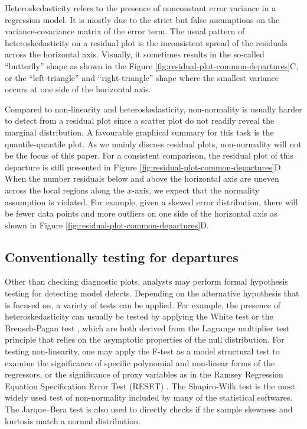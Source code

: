 \documentclass[]{interact}
\theoremstyle{plain}%
\theoremstyle{definition}
\theoremstyle{remark}
\begin{document}
Heteroskedasticity refers to the presence of nonconstant error variance
in a regression model. It is mostly due to the strict but false
assumptions on the variance-covariance matrix of the error term. The
usual pattern of heteroskedasticity on a residual plot is the
inconsistent spread of the residuals across the horizontal axis.
Visually, it sometimes results in the so-called ``butterfly'' shape as
shown in the Figure \ref{fig:residual-plot-common-departures}C, or the
``left-triangle'' and ``right-triangle'' shape where the smallest
variance occurs at one side of the horizontal axis.

Compared to non-linearity and heteroskedasticity, non-normality is
usually harder to detect from a residual plot since a scatter plot do
not readily reveal the marginal distribution. A favourable graphical
summary for this task is the quantile-quantile plot. As we mainly
discuss residual plots, non-normality will not be the focus of this
paper. For a consistent comparison, the residual plot of this departure
is still presented in Figure \ref{fig:residual-plot-common-departures}D.
When the number residuals below and above the horizontal axis are uneven
across the local regions along the \(x\)-axis, we expect that the
normality assumption is violated. For example, given a skewed error
distribution, there will be fewer data points and more outliers on one
side of the horizontal axis as shown in Figure
\ref{fig:residual-plot-common-departures}D.

\hypertarget{conventionally-testing-for-departures}{%
\subsection{Conventionally testing for
departures}\label{conventionally-testing-for-departures}}

Other than checking diagnostic plots, analysts may perform formal
hypothesis testing for detecting model defects. Depending on the
alternative hypothesis that is focused on, a variety of tests can be
applied. For example, the presence of heteroskedasticity can usually be
tested by applying the White test
\citep{white_heteroskedasticity-consistent_1980} or the Breusch-Pagan
test \citep{breusch_simple_1979}, which are both derived from the
Lagrange multiplier test \citep{silvey1959lagrangian} principle that
relies on the asymptotic properties of the null distribution. For
testing non-linearity, one may apply the F-test as a model structural
test to examine the significance of specific polynomial and non-linear
forms of the regressors, or the significance of proxy variables as in
the Ramsey Regression Equation Specification Error Test (RESET)
\citep{ramsey_tests_1969}. The Shapiro-Wilk test
\citep{shapiro1965analysis} is the most widely used test of
non-normality included by many of the statistical softwares. The
Jarque--Bera test \citep{jarque1980efficient} is also used to directly
checks if the sample skewness and kurtosis match a normal distribution.
\end{document}
